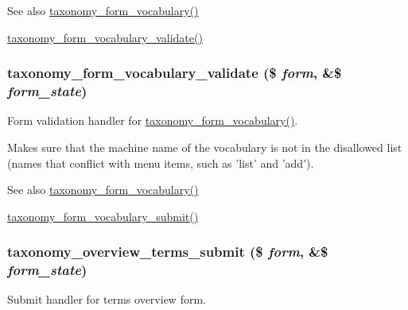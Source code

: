 \begin{DoxySeeAlso}{See also}
\hyperlink{group__forms_gafb93f170208a8c9c125b31ac91e1f966}{taxonomy\_\-form\_\-vocabulary()} 

\hyperlink{taxonomy_8admin_8inc_afab98304eee771ced13ea3999aa8c5b4}{taxonomy\_\-form\_\-vocabulary\_\-validate()} 
\end{DoxySeeAlso}
\hypertarget{taxonomy_8admin_8inc_afab98304eee771ced13ea3999aa8c5b4}{
\subsubsection[{taxonomy\_\-form\_\-vocabulary\_\-validate}]{\setlength{\rightskip}{0pt plus 5cm}taxonomy\_\-form\_\-vocabulary\_\-validate (\$ {\em form}, \/  \&\$ {\em form\_\-state})}}
\label{taxonomy_8admin_8inc_afab98304eee771ced13ea3999aa8c5b4}
Form validation handler for \hyperlink{group__forms_gafb93f170208a8c9c125b31ac91e1f966}{taxonomy\_\-form\_\-vocabulary()}.

Makes sure that the machine name of the vocabulary is not in the disallowed list (names that conflict with menu items, such as 'list' and 'add').

\begin{DoxySeeAlso}{See also}
\hyperlink{group__forms_gafb93f170208a8c9c125b31ac91e1f966}{taxonomy\_\-form\_\-vocabulary()} 

\hyperlink{taxonomy_8admin_8inc_a5fe8d2d826372a29a068cd2c39e38636}{taxonomy\_\-form\_\-vocabulary\_\-submit()} 
\end{DoxySeeAlso}
\hypertarget{taxonomy_8admin_8inc_afb672457712a0a215cdeaa91748b4517}{
\subsubsection[{taxonomy\_\-overview\_\-terms\_\-submit}]{\setlength{\rightskip}{0pt plus 5cm}taxonomy\_\-overview\_\-terms\_\-submit (\$ {\em form}, \/  \&\$ {\em form\_\-state})}}
\label{taxonomy_8admin_8inc_afb672457712a0a215cdeaa91748b4517}
Submit handler for terms overview form.

